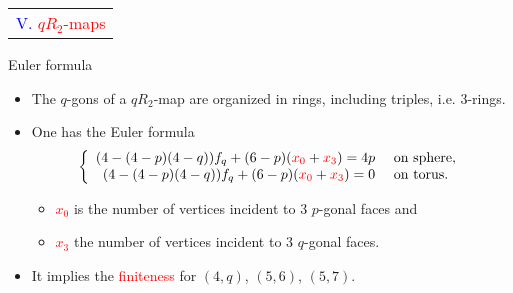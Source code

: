 \documentclass[%
pdf,
colorBG,
slideColor,
]{prosper}
\begin{document}
\begin{slide}{}
\begin{center}
{\Huge 
\begin{tabular*}{8cm}{c}
\\[-0.5cm]
\textcolor{blue}{V. }\textcolor{red}{$qR_2$-maps}\\
\end{tabular*}
}
\end{center}
\end{slide}









\begin{slide}{Euler formula}
\begin{itemize}
\item The $q$-gons of a $qR_2$-map are organized in rings, including triples, i.e. $3$-rings.
\item One has the Euler formula
\begin{equation*}
\left\lbrace\begin{array}{rl}
(4-(4-p)(4-q))f_q+(6-p)(\textcolor{red}{x_0}+\textcolor{red}{x_3})=4p  &\mbox{~on~sphere},\\
(4-(4-p)(4-q))f_q+(6-p)(\textcolor{red}{x_0}+\textcolor{red}{x_3})=0   &\mbox{~on~torus}.
\end{array}\right.
\end{equation*}
\begin{itemize}
\item \textcolor{red}{$x_0$} is the number of vertices incident to $3$ $p$-gonal faces and
\item \textcolor{red}{$x_3$} the number of vertices incident to $3$ $q$-gonal faces.
\end{itemize}
\item It implies the \textcolor{red}{finiteness} for $(4,q)$, $(5,6)$, $(5,7)$.
\end{itemize}

\end{slide}
\end{document}

